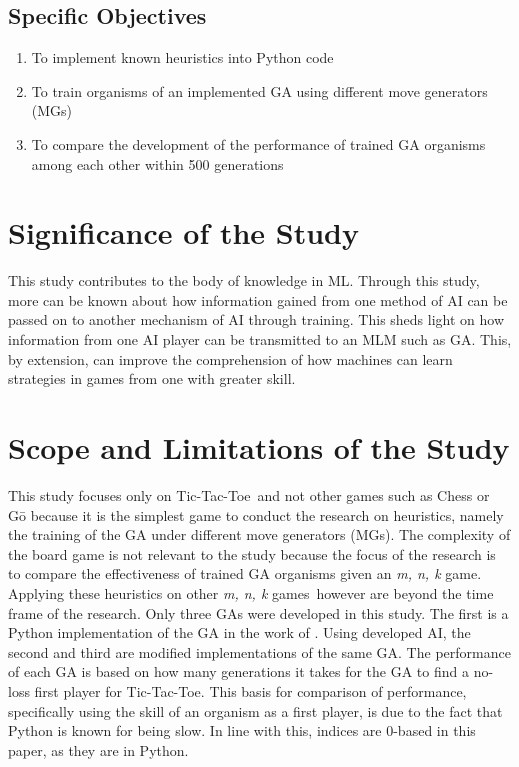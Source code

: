 \documentclass{strrespaper-trad}
\newcommand{\mnk}{\textit{m, n, k} game}
\newcommand{\mnkpl}{\textit{m, n, k} games}
\newcommand{\ttt}{Tic-Tac-Toe}
\begin{document}
			\subsection{Specific Objectives}
				\begin{enumerate}
					\item To implement known heuristics into Python code
					\item To train organisms of an implemented GA using different move generators (MGs)
					\item To compare the development of the performance of trained GA organisms among each other within 500 generations
				\end{enumerate}

		\section{Significance of the Study}
			This study contributes to the body of knowledge in ML.
			Through this study, more can be known about how information gained from one method of AI can be passed on to another mechanism of AI through training.
			This sheds light on how information from one AI player can be transmitted to an MLM such as GA.
			This, by extension, can improve the comprehension of how machines can learn strategies in games from one with greater skill.

		\section{Scope and Limitations of the Study}
			This study focuses only on \ttt\ and not other games such as Chess or G\=o because it is the simplest game to conduct the research on heuristics, namely the training of the GA under different move generators (MGs).
			The complexity of the board game is not relevant to the study because the focus of the research is to compare the effectiveness of trained GA organisms given an \mnk.
			Applying these heuristics on other \mnkpl\ however are beyond the time frame of the research.
			Only three GAs were developed in this study.
			The first is a Python implementation of the GA in the work of \textcite{bhattSearchNolossStrategies2008}.
			Using developed AI, the second and third are modified implementations of the same GA.
			The performance of each GA is based on how many generations it takes for the GA to find a no-loss first player for \ttt.
			This basis for comparison of performance, specifically using the skill of an organism as a first player, is due to the fact that Python is known for being slow.
			In line with this, indices are 0-based in this paper, as they are in Python.
\end{document}
